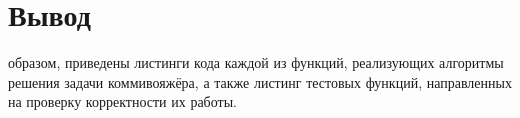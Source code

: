 \section*{Вывод}
 образом, приведены листинги кода каждой из функций, реализующих алгоритмы решения задачи коммивояжёра, а также листинг тестовых функций, направленных на проверку корректности их работы.
